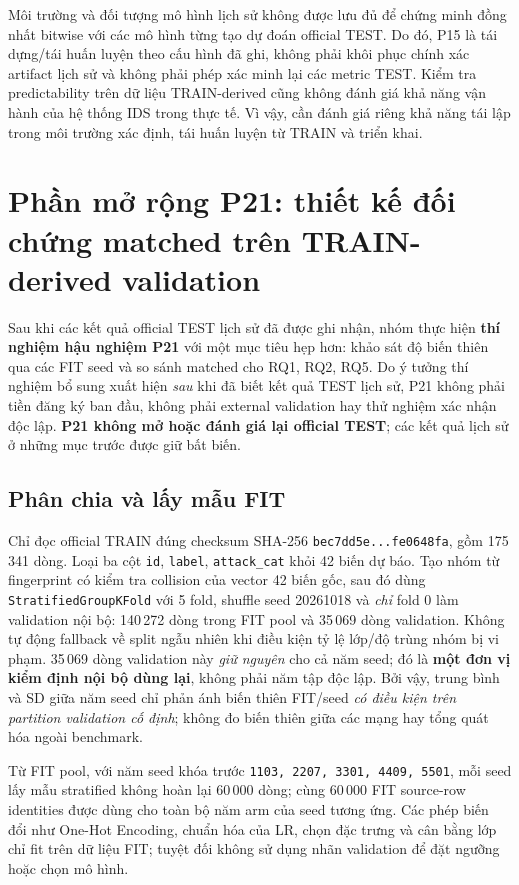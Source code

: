 Môi trường và đối tượng mô hình lịch sử không được lưu đủ để chứng minh đồng nhất bitwise với các mô hình từng tạo dự đoán official TEST. Do đó, P15 là tái dựng/tái huấn luyện theo cấu hình đã ghi, không phải khôi phục chính xác artifact lịch sử và không phải phép xác minh lại các metric TEST. Kiểm tra predictability trên dữ liệu TRAIN-derived cũng không đánh giá khả năng vận hành của hệ thống IDS trong thực tế. Vì vậy, cần đánh giá riêng khả năng tái lập trong môi trường xác định, tái huấn luyện từ TRAIN và triển khai.


\section{Phần mở rộng P21: thiết kế đối chứng matched trên TRAIN-derived validation}
\label{sec:p21-method}
Sau khi các kết quả official TEST lịch sử đã được ghi nhận, nhóm thực hiện \textbf{thí nghiệm hậu nghiệm P21} với một mục tiêu hẹp hơn: khảo sát độ biến thiên qua các FIT seed và so sánh matched cho RQ1, RQ2, RQ5. Do ý tưởng thí nghiệm bổ sung xuất hiện \emph{sau} khi đã biết kết quả TEST lịch sử, P21 không phải tiền đăng ký ban đầu, không phải external validation hay thử nghiệm xác nhận độc lập. \textbf{P21 không mở hoặc đánh giá lại official TEST}; các kết quả lịch sử ở những mục trước được giữ bất biến.

\subsection{Phân chia và lấy mẫu FIT}
Chỉ đọc official TRAIN đúng checksum SHA-256 \texttt{bec7dd5e...fe0648fa}, gồm 175\,341 dòng. Loại ba cột \texttt{id}, \texttt{label}, \texttt{attack\_cat} khỏi 42 biến dự báo. Tạo nhóm từ fingerprint có kiểm tra collision của vector 42 biến gốc, sau đó dùng \texttt{StratifiedGroupKFold} với 5 fold, shuffle seed 20261018 và \emph{chỉ} fold 0 làm validation nội bộ: 140\,272 dòng trong FIT pool và 35\,069 dòng validation. Không tự động fallback về split ngẫu nhiên khi điều kiện tỷ lệ lớp/độ trùng nhóm bị vi phạm. 35\,069 dòng validation này \emph{giữ nguyên} cho cả năm seed; đó là \textbf{một đơn vị kiểm định nội bộ dùng lại}, không phải năm tập độc lập. Bởi vậy, trung bình và SD giữa năm seed chỉ phản ánh biến thiên FIT/seed \emph{có điều kiện trên partition validation cố định}; không đo biến thiên giữa các mạng hay tổng quát hóa ngoài benchmark.

Từ FIT pool, với năm seed khóa trước \texttt{1103, 2207, 3301, 4409, 5501}, mỗi seed lấy mẫu stratified không hoàn lại 60\,000 dòng; cùng 60\,000 FIT source-row identities được dùng cho toàn bộ năm arm của seed tương ứng. Các phép biến đổi như One-Hot Encoding, chuẩn hóa của LR, chọn đặc trưng và cân bằng lớp chỉ fit trên dữ liệu FIT; tuyệt đối không sử dụng nhãn validation để đặt ngưỡng hoặc chọn mô hình.


